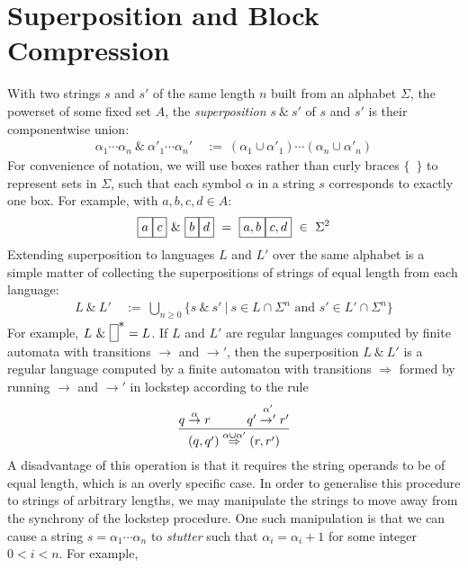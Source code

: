 \documentclass[a4paper,11pt,leqno]{article}
\makeatletter
\newcommand{\vph}[1]{\vphantom{#1}}
\newcommand{\sta}[2]{\stackrel{#1}{#2}}
\newcommand{\ebox}[1]{\fbox{$\vph{',}#1$}}
\newcommand{\eboxl}[1]{\fbox{$\vph{'}#1$}}
\newcommand{\eboxb}[1]{\fbox{$\vph{@}#1$}}
\makeatother
\begin{document}
\section{Superposition and Block Compression}\label{sp and bc}
With two strings $s$ and $s'$ of the same length $n$
built from an alphabet $\Sigma$, the powerset of some fixed set 
$A$,
the \textit{superposition} $s ~\&~ s'$ of $s$ and $s'$ is their componentwise 
union:
\begin{align}
\alpha_1\cdots\alpha_n \ \&\ 
\alpha'_1\cdots\alpha_n' & \ :=\
(\alpha_1\cup\alpha'_1)\cdots(\alpha_n\cup\alpha'_n)
\end{align}
For convenience of notation, we will use boxes rather than curly braces 
$\{$~$\}$ to represent sets in $\Sigma$, such that each symbol $\alpha$ in a 
string $s$ corresponds to exactly one box. For example, with $a, b, c, d \in 
A$:
\begin{align}
\ebox{a}\ebox{c} \ \& \ \ebox{b}\ebox{d} \ = \
\ebox{a, b}\ebox{c, d} \ \in\ \Sigma^2
\end{align}
Extending superposition to languages $L$ and $L'$ over the same alphabet is a 
simple matter of 
collecting the superpositions of strings of equal length from each language: 
\begin{align}
L ~\&~ L' & \ :=\ \bigcup_{n\geq 0}
\{s~\&~s'\ | \ s\in L\cap \Sigma^n\mbox{ and }s'\in L'\cap \Sigma^n\}
\end{align}%
For example, $L ~\&~ \eboxb{}^{\mbox{$\ast$}} = L$.
If $L$ and $L'$ are regular languages computed by finite automata
with transitions $\to$ and $\to'$, then the superposition $L~\&~ L'$ is
a regular language computed by a finite automaton with transitions
$\Rightarrow$
formed by running $\to$ and $\to'$ in lockstep
according to the rule 
\begin{align}
\frac{q \sta{\alpha}{\to} r   \hspace{.4in} q' \sta{\alpha'}{\to'} r'}{
	(q,q') \sta{\alpha\cup\alpha'}{\Rightarrow} (r,r')}
\end{align}
A disadvantage of this operation is that it requires the string operands to be 
of equal length, which is an overly specific case. In order to generalise this 
procedure to strings of arbitrary lengths, we may 
manipulate the strings to move away from the synchrony of the lockstep 
procedure. One such manipulation is that 
we can cause a string $s=\alpha_1\cdots\alpha_n$ to \textit{stutter} such that 
$\alpha_i=\alpha_i+1$ for some integer $0 < i < n$. For example, 
\eboxl{a}\eboxl{a}\eboxl{a}\eboxl{c}\eboxl{c}
\end{document}

